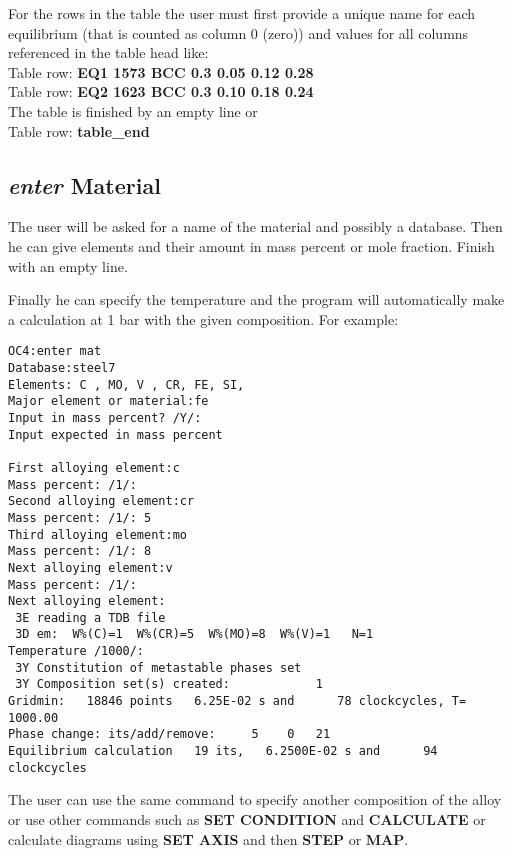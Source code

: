\documentclass[11pt]{article}
\begin{document}
\hypertarget{Enter table row}{}

For the rows in the table the user must first provide a unique name
for each equilibrium (that is counted as column 0 (zero)) and values
for all columns referenced in the table head like:\\
Table row: {\bf EQ1 1573 BCC 0.3 0.05 0.12 0.28}\\
Table row: {\bf EQ2 1623 BCC 0.3 0.10 0.18 0.24}\\

The table is finished by an empty line or\\
Table row: {\bf table\_end}

\hypertarget{Enter material}{}
\subsection{{\em enter} Material}

The user will be asked for a name of the material and possibly a
database.  Then he can give elements and their amount in mass percent
or mole fraction.  Finish with an empty line.

Finally he can specify the temperature and the program will
automatically make a calculation at 1 bar with the given composition.
For example:

\begin{verbatim}
OC4:enter mat
Database:steel7
Elements: C , MO, V , CR, FE, SI,
Major element or material:fe
Input in mass percent? /Y/:
Input expected in mass percent

First alloying element:c
Mass percent: /1/:
Second alloying element:cr
Mass percent: /1/: 5
Third alloying element:mo
Mass percent: /1/: 8
Next alloying element:v
Mass percent: /1/:
Next alloying element:
 3E reading a TDB file
 3D em:  W%(C)=1  W%(CR)=5  W%(MO)=8  W%(V)=1   N=1
Temperature /1000/:
 3Y Constitution of metastable phases set
 3Y Composition set(s) created:            1
Gridmin:   18846 points   6.25E-02 s and      78 clockcycles, T= 1000.00
Phase change: its/add/remove:     5    0   21
Equilibrium calculation   19 its,   6.2500E-02 s and      94 clockcycles

\end{verbatim}

The user can use the same command to specify another composition of
the alloy or use other commands such as {\bf SET CONDITION} and {\bf
  CALCULATE} or calculate diagrams using {\bf SET AXIS} and then {\bf
  STEP} or {\bf MAP}.
\end{document}
